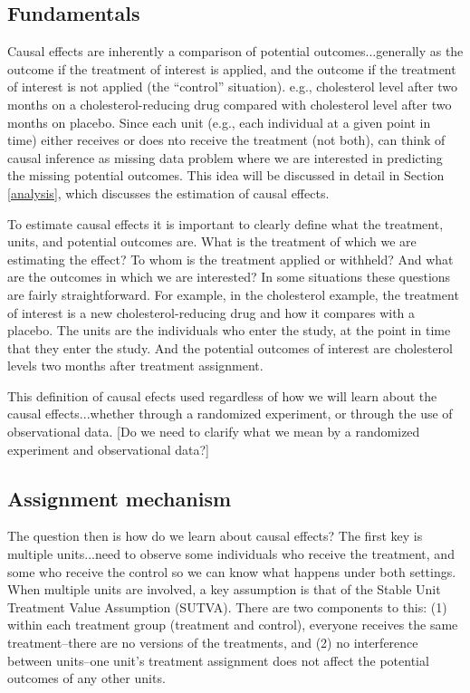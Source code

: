 \documentclass[11pt,titlepage]{article}
\begin{document}
\subsection{Fundamentals}
Causal effects are inherently a comparison of potential outcomes...generally as the outcome if the treatment of interest
is applied, and the outcome if the treatment of interest is not applied (the ``control'' situation).  e.g., cholesterol level
after two months on a cholesterol-reducing drug compared with cholesterol level after two months on placebo.   Since each unit (e.g., each individual
at a given point in time) either receives or does nto receive the treatment (not both), can think of causal inference as missing data problem where 
we are interested in predicting the missing potential outcomes.  This idea will be discussed in detail in Section \ref{analysis}, which discusses the 
estimation of causal effects.

To estimate causal effects it is important to clearly define what the treatment, units, and potential outcomes are.  What is the treatment of which we are 
estimating the effect?  To whom is the treatment applied or withheld?  And what are the outcomes in which we are interested?  In some situations these
questions are fairly straightforward.  For example, in the cholesterol example, the treatment of interest is a new cholesterol-reducing drug and how it compares
with a placebo.  The units are the individuals who enter the study, at the point in time that they enter the study.  And the potential outcomes of interest
are cholesterol levels two months after treatment assignment.

This definition of causal efects used regardless of how we will learn about the causal effects...whether through a randomized experiment, or through the use of 
observational data.  [Do we need to clarify what we mean by a randomized experiment and observational data?]

\subsection{Assignment mechanism}
The question then is how do we learn about causal effects?  The first key is multiple units...need to observe some individuals who receive the treatment,
and some who receive the control so we can know what happens under both settings.  When multiple units are involved, a key assumption
is that of the Stable Unit Treatment Value Assumption (SUTVA).  There are two components to this: (1) within each treatment group (treatment and control), 
everyone receives the same treatment--there are no versions of the treatments, and (2) no interference between units--one unit's treatment assignment does
not affect the potential outcomes of any other units. 
\end{document}
